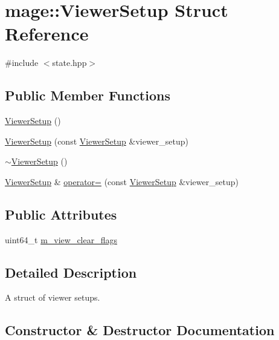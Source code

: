 \hypertarget{structmage_1_1_viewer_setup}{}\section{mage\+:\+:Viewer\+Setup Struct Reference}
\label{structmage_1_1_viewer_setup}


{\ttfamily \#include $<$state.\+hpp$>$}

\subsection*{Public Member Functions}
\begin{DoxyCompactItemize}
\item 
\hyperlink{structmage_1_1_viewer_setup_a41acbd3bd1b8df2e175a57ee9bd07bda}{Viewer\+Setup} ()
\item 
\hyperlink{structmage_1_1_viewer_setup_a4358e8d3e83b61720bec3e921c438fc9}{Viewer\+Setup} (const \hyperlink{structmage_1_1_viewer_setup}{Viewer\+Setup} \&viewer\+\_\+setup)
\item 
\hyperlink{structmage_1_1_viewer_setup_abc25ec011dfcee9c0c40b9ae89e3e1b1}{$\sim$\+Viewer\+Setup} ()
\item 
\hyperlink{structmage_1_1_viewer_setup}{Viewer\+Setup} \& \hyperlink{structmage_1_1_viewer_setup_a2828b504ea3b85a0f8421bac32fa37dd}{operator=} (const \hyperlink{structmage_1_1_viewer_setup}{Viewer\+Setup} \&viewer\+\_\+setup)
\end{DoxyCompactItemize}
\subsection*{Public Attributes}
\begin{DoxyCompactItemize}
\item 
uint64\+\_\+t \hyperlink{structmage_1_1_viewer_setup_aed7b78b5437c46627949142f628c331d}{m\+\_\+view\+\_\+clear\+\_\+flags}
\end{DoxyCompactItemize}


\subsection{Detailed Description}
A struct of viewer setups. 

\subsection{Constructor \& Destructor Documentation}
\hypertarget{structmage_1_1_viewer_setup_a41acbd3bd1b8df2e175a57ee9bd07bda}{}\label{structmage_1_1_viewer_setup_a41acbd3bd1b8df2e175a57ee9bd07bda} 
